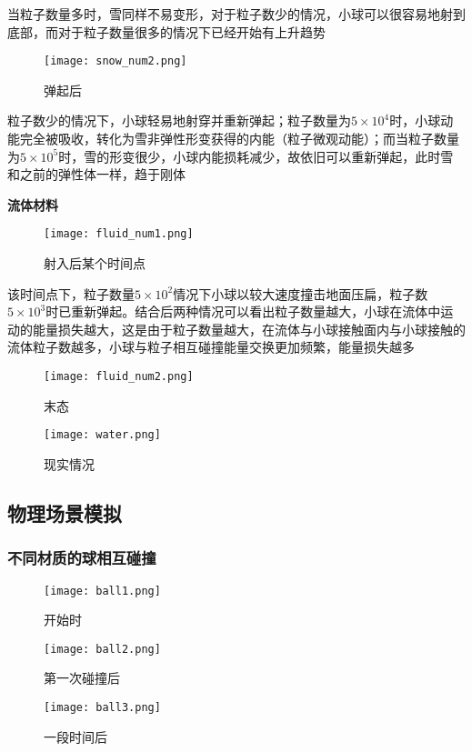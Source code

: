 \documentclass[14pt]{scrartcl} %
\begin{document}
当粒子数量多时，雪同样不易变形，对于粒子数少的情况，小球可以很容易地射到底部，而对于粒子数量很多的情况下已经开始有上升趋势

\pagebreak
\begin{figure}[h]
	\centering
	\texttt{[image: snow\_num2.png]} %
	\caption{弹起后}
\end{figure}

粒子数少的情况下，小球轻易地射穿并重新弹起；粒子数量为$5\times 10^4$时，小球动能完全被吸收，转化为雪非弹性形变获得的内能（粒子微观动能）；而当粒子数量为$5\times 10^5$时，雪的形变很少，小球内能损耗减少，故依旧可以重新弹起，此时雪和之前的弹性体一样，趋于刚体

\pagebreak
\textbf{流体材料}
\begin{figure}[h]
	\centering
	\texttt{[image: fluid\_num1.png]} %
	\caption{射入后某个时间点}
\end{figure}

该时间点下，粒子数量$5\times 10^2$情况下小球以较大速度撞击地面压扁，粒子数$5\times10^3$时已重新弹起。结合后两种情况可以看出粒子数量越大，小球在流体中运动的能量损失越大，这是由于粒子数量越大，在流体与小球接触面内与小球接触的流体粒子数越多，小球与粒子相互碰撞能量交换更加频繁，能量损失越多

\pagebreak

\begin{figure}[htbp]
	\centering
	\texttt{[image: fluid\_num2.png]} %
	\caption{末态}
\end{figure}

\begin{figure}[htbp]
	\centering
	\texttt{[image: water.png]} %
	\caption{现实情况}
\end{figure}

\pagebreak
\subsection{物理场景模拟}

\subsubsection{不同材质的球相互碰撞}
\begin{figure}[htbp]
	\centering
	\texttt{[image: ball1.png]} %
	\caption{开始时}
		\centering
	\texttt{[image: ball2.png]} %
	\caption{第一次碰撞后}
		\centering
	\texttt{[image: ball3.png]} %
	\caption{一段时间后}
\end{figure}
\end{document}
